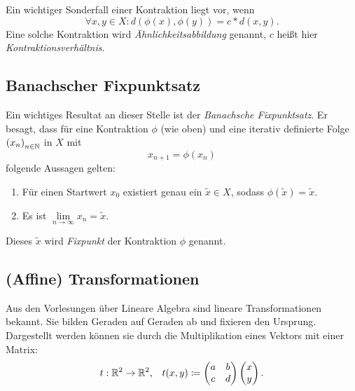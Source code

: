 \documentclass[afourpaper]{latex-classes/handout}
\begin{document}
Ein wichtiger Sonderfall einer Kontraktion liegt vor, wenn
\begin{equation*}
  \forall x,y \in X : d(\phi(x), \phi(y)) \bm{=} c * d(x,y)\text{.}
\end{equation*}
Eine solche Kontraktion wird \emph{Ähnlichkeitsabbildung} genannt, \( c \) heißt hier \emph{Kontraktionsverhältnis}.

\subsection{Banachscher Fixpunktsatz}

Ein wichtiges Resultat an dieser Stelle ist der \emph{Banachsche Fixpunktsatz}. Er besagt, dass für eine Kontraktion \( \phi \) (wie oben) und eine iterativ definierte Folge \( {(x_n)}_{n \in \mathbb{N}} \) in \( X \) mit
\begin{equation*}
  x_{n+1} = \phi(x_n)
\end{equation*}
folgende Aussagen gelten:
\begin{enumerate}
  \item Für einen  Startwert \( x_0 \) existiert genau ein \( \widetilde{x} \in X \), sodass \( \phi(\widetilde{x}) = \widetilde{x} \).
  \item Es ist \( \underset{n \to \infty}{\lim} x_n = \widetilde{x} \).
\end{enumerate}

Dieses \( \widetilde{x} \) wird \emph{Fixpunkt} der Kontraktion \( \phi \) genannt.

\subsection{(Affine) Transformationen}

Aus den Vorlesungen über Lineare Algebra sind lineare Transformationen bekannt. Sie bilden Geraden auf Geraden ab und fixieren den Ursprung. Dargestellt werden können sie durch die Multiplikation eines Vektors mit einer Matrix:
\begin{equation*}
  t: \mathbb{R}^2 \to \mathbb{R}^2\text{,} \quad t(x,y) \coloneqq \begin{pmatrix}
    a & b \\ c & d
  \end{pmatrix} \begin{pmatrix}
    x \\ y
  \end{pmatrix}\text{.}
\end{equation*}
\end{document}
